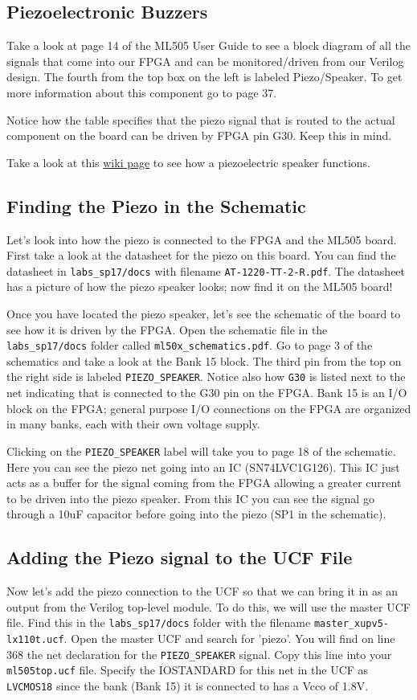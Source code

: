 \documentclass[11pt]{article}
\begin{document}
\subsection{Piezoelectronic Buzzers}
Take a look at page 14 of the ML505 User Guide to see a block diagram of all the signals that come into our FPGA and can be monitored/driven from our Verilog design. The fourth from the top box on the left is labeled Piezo/Speaker. To get more information about this component go to page 37.

Notice how the table specifies that the piezo signal that is routed to the actual component on the board can be driven by FPGA pin G30. Keep this in mind.

Take a look at this \href{https://en.wikipedia.org/wiki/Piezoelectric_speaker}{wiki page} to see how a piezoelectric speaker functions.

\subsection{Finding the Piezo in the Schematic}
Let's look into how the piezo is connected to the FPGA and the ML505 board. First take a look at the datasheet for the piezo on this board. You can find the datasheet in \verb|labs_sp17/docs| with filename \verb|AT-1220-TT-2-R.pdf|. The datasheet has a picture of how the piezo speaker looks; now find it on the ML505 board!

Once you have located the piezo speaker, let's see the schematic of the board to see how it is driven by the FPGA. Open the schematic file in the \verb|labs_sp17/docs| folder called \verb|ml50x_schematics.pdf|. Go to page 3 of the schematics and take a look at the Bank 15 block. The third pin from the top on the right side is labeled \verb|PIEZO_SPEAKER|. Notice also how \verb|G30| is listed next to the net indicating that is connected to the G30 pin on the FPGA. Bank 15 is an I/O block on the FPGA; general purpose I/O connections on the FPGA are organized in many banks, each with their own voltage supply.

Clicking on the \verb|PIEZO_SPEAKER| label will take you to page 18 of the schematic. Here you can see the piezo net going into an IC (SN74LVC1G126). This IC just acts as a buffer for the signal coming from the FPGA allowing a greater current to be driven into the piezo speaker. From this IC you can see the signal go through a 10uF capacitor before going into the piezo (SP1 in the schematic).

\subsection{Adding the Piezo signal to the UCF File}
Now let's add the piezo connection to the UCF so that we can bring it in as an output from the Verilog top-level module. To do this, we will use the master UCF file. Find this in the \verb|labs_sp17/docs| folder with the filename \verb|master_xupv5-lx110t.ucf|. Open the master UCF and search for 'piezo'. You will find on line 368 the net declaration for the \verb|PIEZO_SPEAKER| signal. Copy this line into your \verb|ml505top.ucf| file. Specify the IOSTANDARD for this net in the UCF as \verb|LVCMOS18| since the bank (Bank 15) it is connected to has a Vcco of 1.8V.
\end{document}
